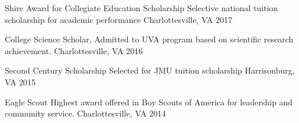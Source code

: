 \begin{cvhonors}
  \cvhonor
    {Shire Award for Collegiate Education Scholarship} %
    {Selective national tuition scholarship for academic performance} %
    {Charlottesville, VA} %
    {2017} %

  \cvhonor
    {College Science Scholar,} %
    {Admitted to UVA program based on scientific research achievement.} %
    {Charlottesville, VA} %
    {2016} %

  \cvhonor
    {Second Century Scholarship} %
    {Selected for JMU tuition scholarship} %
    {Harrisonburg, VA} %
    {2015} %
    
  \cvhonor
    {Eagle Scout} %
    {Highest award offered in Boy Scouts of America for leadership and community service.} %
    {Charlottesville, VA} %
    {2014} %


\end{cvhonors}







